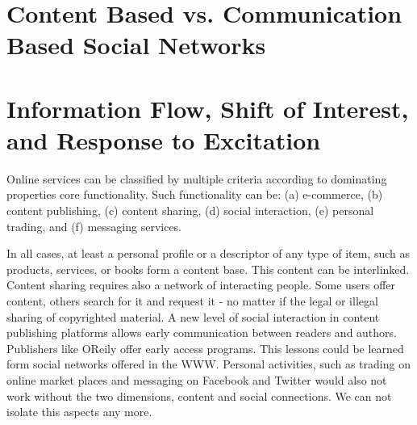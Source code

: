 \documentclass[a4paper,10pt]{scrbook}
\begin{document}


\section{Content Based vs. Communication Based Social Networks}



\section{Information Flow, Shift of Interest, and Response to Excitation}
Online services can be classified by multiple criteria according to dominating properties core functionality. Such functionality can be: (a) e-commerce, (b) content publishing, (c) content sharing, (d) social interaction, (e) personal trading, and (f) messaging services. 

In all cases, at least a personal profile or a descriptor of any type of item, such as products, services, or books form a content base. This content can be interlinked. Content sharing requires also a network of interacting people. Some users offer content, others search for it and request it - no matter if the legal or illegal sharing of copyrighted material. A new level of social interaction in content publishing platforms allows early communication between readers and authors. Publishers like OReily offer early access programs. This lessons could be learned form social networks offered in the WWW. Personal activities, such as trading on online market places and messaging on Facebook and Twitter would also not work without the two dimensions, content and social connections. We can not isolate this aspects any more. 
\end{document}
